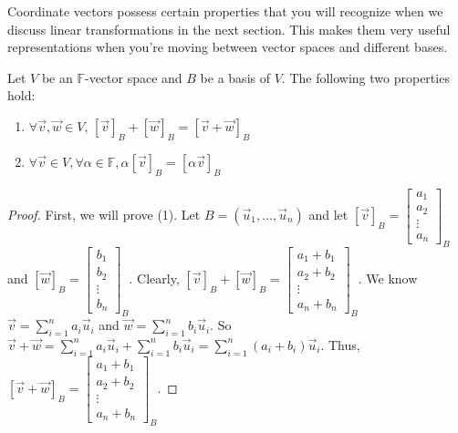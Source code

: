 Coordinate vectors possess certain properties that you will recognize when we discuss linear transformations in the next section. This makes them very useful representations when you're moving between vector spaces and different bases.
\begin{theorem}
    Let $V$ be an $\mathbb{F}$-vector space and $B$ be a basis of $V$. The following two properties hold:
    \begin{enumerate}
        \item $\forall\vec{v},\vec{w}\in V,\,[\vec{v}]_B+[\vec{w}]_B=[\vec{v}+\vec{w}]_B$
        \item $\forall\vec{v}\in V,\forall\alpha\in\mathbb{F}, \alpha[\vec{v}]_B=[\alpha\vec{v}]_B$
    \end{enumerate}
\end{theorem}
\begin{proof}
    First, we will prove (1). Let $B=(\vec{u}_1,\ldots,\vec{u}_n)$ and let $[\vec{v}]_B=\left[\begin{smallmatrix}
        a_1 \\ a_2 \\ \vdots \\ a_n
    \end{smallmatrix}\right]_B$ and $[\vec{w}]_B=\left[\begin{smallmatrix}
        b_1 \\ b_2 \\ \vdots \\ b_n
    \end{smallmatrix}\right]_B$. Clearly, $[\vec{v}]_B+[\vec{w}]_B=\left[\begin{smallmatrix}
        a_1 + b_1 \\ a_2 + b_2 \\ \vdots \\ a_n + b_n
    \end{smallmatrix}\right]_B$. We know $\vec{v}=\sum_{i=1}^n a_i\vec{u}_i$ and $\vec{w}=\sum_{i=1}^n b_i\vec{u}_i$. So $\vec{v}+\vec{w}=\sum_{i=1}^n a_i\vec{u}_i+\sum_{i=1}^n b_i\vec{u}_i=\sum_{i=1}^n (a_i+b_i)\vec{u}_i$. Thus, $[\vec{v}+\vec{w}]_B=\left[\begin{smallmatrix}
        a_1 + b_1 \\ a_2 + b_2 \\ \vdots \\ a_n + b_n
    \end{smallmatrix}\right]_B$.


\end{proof}

